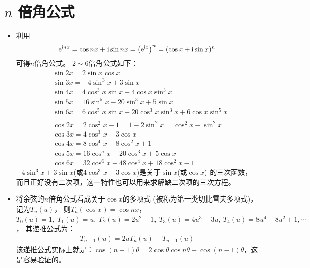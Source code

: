 \section{$ n $ 倍角公式}
\begin{itemize}[leftmargin=\inteval{\myitemleftmargin}pt,itemsep=
   \inteval{\myitemitempsep}pt,topsep=\inteval{\myitemtopsep}pt]
\item 利用
\begin{gather}\label{欧拉公式n倍角情形}
    \mathrm{e}^{\mathrm{i} nx}=\cos nx +\mathrm{i}\sin nx=\left(
    \mathrm{e}^{\mathrm{i} x} \right)^n =(\cos x+\mathrm{i}\sin x)^n
\end{gather}
可得$ n $倍角公式。 $ 2\sim 6 $倍角公式如下：
\begin{align*}
    & \sin 2x=2\sin x\cos x \\    
    & \sin 3x=-4 \sin^3 x+ 3\sin x 	  \\
    & \sin 4x=4\cos^3x\sin x-4\cos x\sin^3 x  \\
    & \sin 5x=16\sin^5 x-20\sin^3 x+5 \sin x  \\
    & \sin 6x=6\cos^5 x\sin x-20\cos^3 x\sin^3 x+6\cos x \sin^5 x \\
    \\
    & \cos 2x=2\cos^2 x-1=1-2\sin^2 x=\cos^2 x- \sin^2 x  \\		
    & \cos 3x=4 \cos^3 x- 3\cos x  \\		
    & \cos 4x=8 \cos^4 x- 8\cos^2 x+1  \\		
    & \cos 5x=16\cos^5 x- 20\cos^3 x+5\cos x  \\
    & \cos 6x=32\cos^6 x-48\cos^4 x+ 18\cos^2 x-1 
\end{align*}
$ -4 \sin^3 x+ 3\sin x $(或$ 4 \cos^3 x- 3\cos x $)是关于$ \sin x $(或$ \cos x $)
的三次函数，而且正好没有二次项，这一特性也可以用来求解缺二次项的三次方程。

\item 将余弦的$ n $倍角公式看成关于$ \cos x $的多项式
(被称为第一类切比雪夫多项式)，记为$ T_n(u) $，
则$ T_n(\cos x)=\cos nx $，
$ T_0(u)=1,\ T_1(u)=u,\ T_2(u)=2u^2-1,\ T_3(u)=4u^3-3u,\ T_4(u)=8u^4-8u^2+1,\cdots $，
其递推公式为：
\begin{align}\label{车比雪夫多项式递推关系}
    T_{n+1}(u)=2uT_n(u)-T_{n-1}(u)
\end{align}
该递推公式实际上就是：$ \cos(n+1)\theta=2\cos\theta\cos n\theta-
\cos(n-1)\theta $，这是容易验证的。 


\end{itemize}
